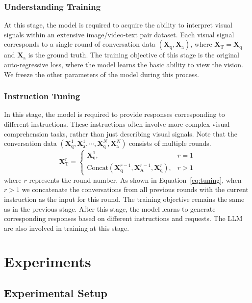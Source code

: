 \subsubsection{Understanding Training}
At this stage, the model is required to acquire the ability to interpret visual signals within an extensive image/video-text pair dataset. Each visual signal corresponds to a single round of conversation data $(\mathbf{X}_{\mathrm{q}}, \mathbf{X}_{\mathrm{a}})$, where $\mathbf{X}_{\text{T}}=\mathbf{X}_{\mathrm{q}}$ and $\mathbf{X}_{\mathrm{a}}$ is the ground truth. The training objective of this stage is the original auto-regressive loss, where the model learns the basic ability to view the vision. We freeze the other parameters of the model during this process.

\subsubsection{Instruction Tuning}
In this stage, the model is required to provide responses corresponding to different instructions. These instructions often involve more complex visual comprehension tasks, rather than just describing visual signals. Note that the conversation data $\left(\mathbf{X}_{\mathrm{q}}^1, \mathbf{X}_{\mathrm{a}}^1, \cdots, \mathbf{X}_{\mathrm{q}}^N, \mathbf{X}_{\mathrm{a}}^N\right)$ consists of multiple rounds.
\begin{equation}
\mathbf{X}_{\text{T}}^r=\left\{\begin{array}{lr}
\mathbf{X}_{\mathrm{q}}^1, & r=1 \\
\text{Concat}(\mathbf{X}_{\mathrm{q}}^{r-1}, \mathbf{X}_{\text{A}}^{r-1}, \mathbf{X}_{\mathrm{q}}^r), & r>1
\end{array}\right.
  \label{eq:tuning}
\end{equation}
where $r$ represents the round number. As shown in Equation~\ref{eq:tuning}, when $r>1$ we concatenate the conversations from all previous rounds with the current instruction as the input for this round. The training objective remains the same as in the previous stage. After this stage, the model learns to generate corresponding responses based on different instructions and requests. The LLM are also involved in training at this stage.

\section{Experiments}
\label{sec:exp}

\subsection{Experimental Setup}

